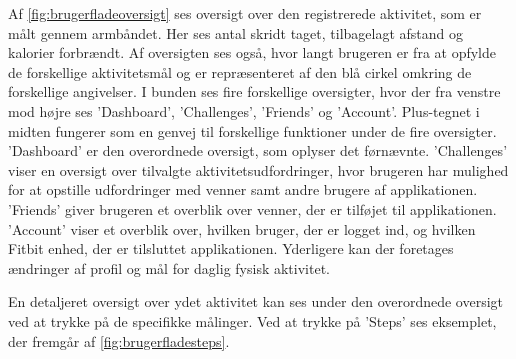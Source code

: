 \noindent
Af \autoref{fig:brugerfladeoversigt} ses oversigt over den registrerede aktivitet, som er målt gennem armbåndet. Her ses antal skridt taget, tilbagelagt afstand og kalorier forbrændt. Af oversigten ses også, hvor langt brugeren er fra at opfylde de forskellige aktivitetsmål og er repræsenteret af den blå cirkel omkring de forskellige angivelser. 
I bunden ses fire forskellige oversigter, hvor der fra venstre mod højre ses 'Dashboard', 'Challenges', 'Friends' og 'Account'. Plus-tegnet i midten fungerer som en genvej til forskellige funktioner under de fire oversigter. 
'Dashboard' er den overordnede oversigt, som oplyser det førnævnte.
'Challenges' viser en oversigt over tilvalgte aktivitetsudfordringer, hvor brugeren har mulighed for at opstille udfordringer med venner samt andre brugere af applikationen. 
'Friends' giver brugeren et overblik over venner, der er tilføjet til applikationen. 
'Account' viser et overblik over, hvilken bruger, der er logget ind, og hvilken Fitbit enhed, der er tilsluttet applikationen. Yderligere kan der foretages ændringer af profil og mål for daglig fysisk aktivitet. 

En detaljeret oversigt over ydet aktivitet kan ses under den overordnede oversigt ved at trykke på de specifikke målinger. Ved at trykke på 'Steps' ses eksemplet, der fremgår af \autoref{fig:brugerfladesteps}.  

